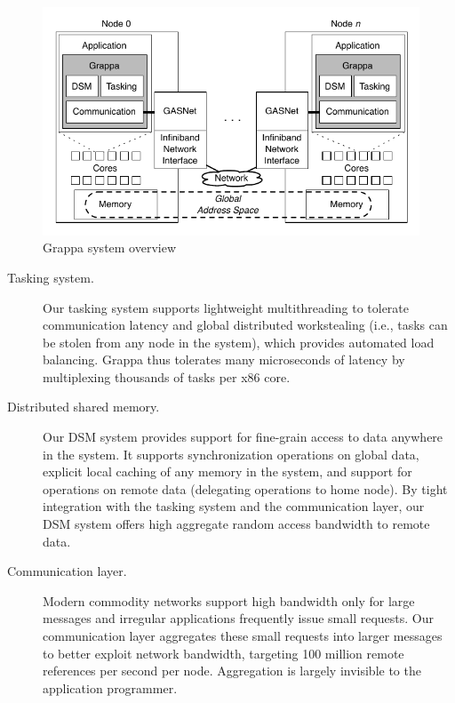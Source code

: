 \begin{figure}[t]
\begin{center}
  \includegraphics[width=0.95\columnwidth]{../asplos13/figs/system-overview}
\begin{minipage}{0.95\columnwidth}
  \caption{\label{fig:grappa} Grappa system overview}
\end{minipage}
\vspace{-3ex}
\end{center}
\end{figure}


\begin{description}

\item [Tasking system.] Our tasking system supports lightweight
multithreading to tolerate communication latency and global distributed
workstealing (i.e., tasks can be stolen from any node in the system), which
provides automated load balancing.  Grappa thus tolerates many
microseconds of latency by multiplexing thousands of tasks per x86 core.

\item[Distributed shared memory.] Our DSM system provides support for
fine-grain access to data anywhere in the system. It supports synchronization
operations on global data, explicit local caching of any memory in the system,
and support for operations on remote data (delegating operations to home node).
By tight integration with the tasking system and the
communication layer, our DSM system offers high aggregate random
access bandwidth to remote data.

\item[Communication layer.] Modern commodity networks
support high bandwidth only for large messages and irregular applications
frequently issue small requests.   Our communication layer aggregates these small requests into larger messages to better exploit network bandwidth, targeting 100 million remote references per second per node.  Aggregation is largely invisible to the application programmer.


\end{description}

